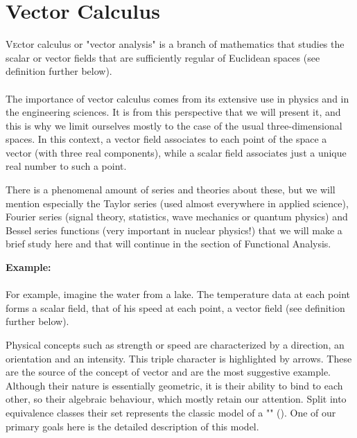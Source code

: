 	\newpage
	\thispagestyle{empty}
	\mbox{}
	\section{Vector Calculus}\label{vector calculus}

	\lettrine[lines=4]{\color{BrickRed}V}ector calculus or "vector analysis" is a branch of mathematics that studies the scalar or vector fields that are sufficiently regular of Euclidean spaces (see definition further below).\\\\

The importance of vector calculus comes from its extensive use in physics and in the engineering sciences. It is from this perspective that we will present it, and this is why we limit ourselves mostly to the case of the usual three-dimensional spaces. In this context, a vector field associates to each point of the space a vector (with three real components), while a scalar field associates just a unique real number to such a point.

There is a phenomenal amount of series and theories about these, but we will mention especially the Taylor series (used almost everywhere in applied science), Fourier series (signal theory, statistics, wave mechanics or quantum physics) and Bessel series functions (very important in nuclear physics!) that we will make a brief study here and that will continue in the section of Functional Analysis.

	\begin{tcolorbox}[colframe=black,colback=white,sharp corners]
\textbf{{\Large {}}Example:}\\\\
For example, imagine the water from a lake. The temperature data at each point forms a scalar field, that of his speed at each point, a vector field (see definition further below).
	\end{tcolorbox}

Physical concepts such as strength or speed are characterized by a direction, an orientation and an intensity. This triple character is highlighted by arrows. These are the source of the concept of vector and are the most suggestive example. Although their nature is essentially geometric, it is their ability to bind to each other, so their algebraic behaviour, which mostly retain our attention. Split into equivalence classes their set represents the classic model of a "" (). One of our primary goals here is the detailed description of this model.

